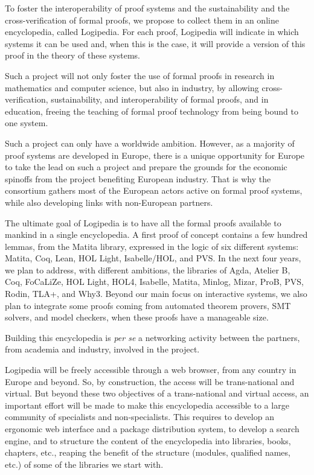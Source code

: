 To foster the interoperability of proof systems and the sustainability
and the cross-verification of formal proofs, we propose to collect
them in an online encyclopedia, called Logipedia.  For each proof,
Logipedia will indicate in which systems it can be used and, when this
is the case, it will provide a version of this proof in the theory of
these systems.

Such a project will not only foster the use of formal proofs in
research in mathematics and computer science, but also in industry, by
allowing cross-verification, sustainability, and interoperability of
formal proofs, and in education, freeing the teaching of formal proof
technology from being bound to one system.

Such a project can only have a worldwide ambition. However, as a
majority of proof systems are developed in Europe, there is a unique
opportunity for Europe to take the lead on such a project and prepare
the grounds for the economic spinoffs from the project benefiting
European industry. That is why the consortium gathers most of the
European actors active on formal proof systems, while also developing
links with non-European partners.

The ultimate goal of Logipedia is to have all the formal proofs
available to mankind in a single encyclopedia.  A first proof of
concept contains a few hundred lemmas, from the Matita library,
expressed in the logic of six different systems: Matita, Coq, Lean,
HOL Light, Isabelle/HOL, and PVS.  In the next four years, we plan to
address, with different ambitions, the libraries of Agda, Atelier B,
Coq, FoCaLiZe, HOL Light, HOL4, Isabelle, Matita, Minlog, Mizar, ProB,
PVS, Rodin, TLA+, and Why3.  Beyond our main focus on interactive
systems, we also plan to integrate some proofs coming from automated
theorem provers, SMT solvers, and model checkers, when these proofs
have a manageable size.

Building this encyclopedia is {\em per se} a networking activity
between the partners, from academia and industry, involved in the
project.

Logipedia will be freely accessible through a web browser, from any
country in Europe and beyond. So, by construction, the access will be
trans-national and virtual. But beyond these two objectives of a
trans-national and virtual access, an important effort will be made to
make this encyclopedia accessible to a large community of specialists
and non-specialists. This requires to develop an ergonomic web
interface and a package distribution system, to develop a search
engine, and to structure the content of the encyclopedia into
libraries, books, chapters, etc., reaping the benefit of the structure
(modules, qualified names, etc.) of some of the libraries we start
with.

